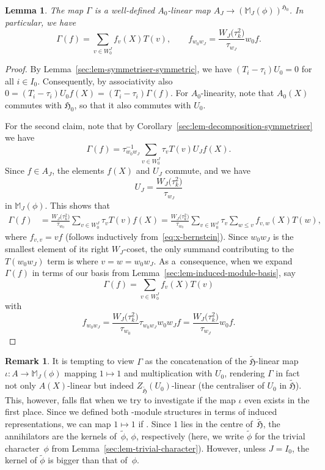 \documentclass[10pt,a4paper]{amsart}
\newtheorem{Lemma}[Theorem]{Lemma}
\theoremstyle{definition}
\newtheorem{Remark}[Theorem]{Remark}
\numberwithin{equation}{section}
\begin{document}
\begin{Lemma}\label{sec:lem-Gamma-invariant-highest-term}
 The map $\Gamma$ is a well-defined $A_0$-linear map
 $A_J\to (\mathbb{M}_J(\phi))^{\mathfrak{H}_0}$.
 In particular, we have
 \[
 \Gamma(f) = \sum_{v\in W_0^J} f_v(X) T(v),\qquad f_{w_0w_J}=\frac{W_J\bigl(\tau_k^2\bigr)}{\tau_{w_J}} w_0f.
 \]
\end{Lemma}
\begin{proof}
 By Lemma~\ref{sec:lem-symmetriser-symmetric}, we have $(T_i-\tau_i)U_0=0$ for all $i\in I_0$. Consequently,
 by associativity also
$0 = (T_i-\tau_i)U_0 f(X) = (T_i-\tau_i)\Gamma(f)$.
 For $A_0$-linearity, note that $A_0(X)$ commutes with
 $\mathfrak{H}_0$, so that it also commutes with $U_0$.

 For the second claim, note that by Corollary~\ref{sec:lem-decomposition-symmetriser} we have
 \[
 \Gamma(f) = \tau_{w_0w_J}^{-1} \sum_{v\in W_0^J} \tau_v T(v)
 U_J f(X).
 \]
 Since $f\in A_J$, the elements $f(X)$ and $U_J$ commute, and we have
 \[
 U_J = \frac{W_J\bigl(\tau_k^2\bigr)}{\tau_{w_J}}
 \]
 in $\mathbb{M}_J(\phi)$. This shows that
 \begin{align*}
 \Gamma(f)
 &= \frac{W_J\bigl(\tau_k^2\bigr)}{\tau_{w_0}} \sum_{v\in W_0^J} \tau_v T(v)
 f(X)= \frac{W_J\bigl(\tau_k^2\bigr)}{\tau_{w_0}} \sum_{v\in W_0^J} \tau_v
 \sum_{w\le v} f_{v,w}(X) T(w),
 \end{align*}
 where $f_{v,v} = v f$ (follows inductively from~\eqref{eq:x-bernstein}). Since $w_0w_J$ is the smallest element of its right
 $W_J$-coset, the only summand contributing to the $T(w_0w_J)$ term
 is where $v=w=w_0w_J$. As a~consequence, when we expand $\Gamma(f)$ in
 terms of our basis from Lemma~\ref{sec:lem-induced-module-basis},
 say
 \[
 \Gamma(f) = \sum_{v\in W_0^J} f_v(X)T(v)
 \]
 with
 \[
 f_{w_0w_J} = \frac{W_J\bigl(\tau_k^2\bigr)}{\tau_{w_0}} \tau_{w_0w_J}
 w_0w_J f = \frac{W_J\bigl(\tau_k^2\bigr)}{\tau_{w_J}} w_0 f.\tag*{\qed}
 \]\renewcommand{\qed}{}
\end{proof}

\begin{Remark}\label{sec:rk-htilde-intertwiner}
 It is tempting to view $\Gamma$ as the concatenation of
 the $\tilde{\mathfrak{H}}$-linear map $\iota\colon A\to\mathbb{M}_J(\phi)$ mapping $1\mapsto 1$ and multiplication with $U_0$, rendering $\Gamma$ in fact
 not only $A(X)$-linear but indeed $Z_{\tilde{\mathfrak{H}}}(U_0)$-linear \big(the centraliser of $U_0$ in $\tilde{\mathfrak{H}}$\big).
 This, however, falls flat when we try to investigate if the map $\iota$
 even exists in the first place. Since we defined both -module structures
 in terms of induced representations, we can map $1\mapsto 1$ if
 .
 Since $1$ lies in the centre of~$\tilde{\mathfrak{H}}$, the annihilators
 are the kernels of~$\tilde{\phi}$, $\phi$, respectively (here, we write
 $\tilde{\phi}$ for the trivial character~$\phi$ from Lemma~\ref{sec:lem-trivial-character}). However, unless
 $J=I_0$, the kernel of $\tilde{\phi}$ is bigger
 than that of~$\phi$.
\end{Remark}
\end{document}
